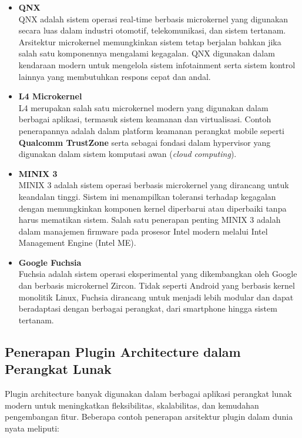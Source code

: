 \begin{itemize}
	\item \textbf{QNX} \\
	QNX adalah sistem operasi real-time berbasis microkernel yang digunakan secara luas dalam industri otomotif, telekomunikasi, dan sistem tertanam. Arsitektur microkernel memungkinkan sistem tetap berjalan bahkan jika salah satu komponennya mengalami kegagalan. QNX digunakan dalam kendaraan modern untuk mengelola sistem infotainment serta sistem kontrol lainnya yang membutuhkan respons cepat dan andal.
	
	\item \textbf{L4 Microkernel} \\
	L4 merupakan salah satu microkernel modern yang digunakan dalam berbagai aplikasi, termasuk sistem keamanan dan virtualisasi. Contoh penerapannya adalah dalam platform keamanan perangkat mobile seperti \textbf{Qualcomm TrustZone} serta sebagai fondasi dalam hypervisor yang digunakan dalam sistem komputasi awan (\textit{cloud computing}).
	
	\item \textbf{MINIX 3} \\
	MINIX 3 adalah sistem operasi berbasis microkernel yang dirancang untuk keandalan tinggi. Sistem ini menampilkan toleransi terhadap kegagalan dengan memungkinkan komponen kernel diperbarui atau diperbaiki tanpa harus mematikan sistem. Salah satu penerapan penting MINIX 3 adalah dalam manajemen firmware pada prosesor Intel modern melalui Intel Management Engine (Intel ME).
	
	\item \textbf{Google Fuchsia} \\
	Fuchsia adalah sistem operasi eksperimental yang dikembangkan oleh Google dan berbasis microkernel Zircon. Tidak seperti Android yang berbasis kernel monolitik Linux, Fuchsia dirancang untuk menjadi lebih modular dan dapat beradaptasi dengan berbagai perangkat, dari smartphone hingga sistem tertanam.
\end{itemize}


\subsection{Penerapan Plugin Architecture dalam Perangkat Lunak}

Plugin architecture banyak digunakan dalam berbagai aplikasi perangkat lunak modern untuk meningkatkan fleksibilitas, skalabilitas, dan kemudahan pengembangan fitur. Beberapa contoh penerapan arsitektur plugin dalam dunia nyata meliputi:

